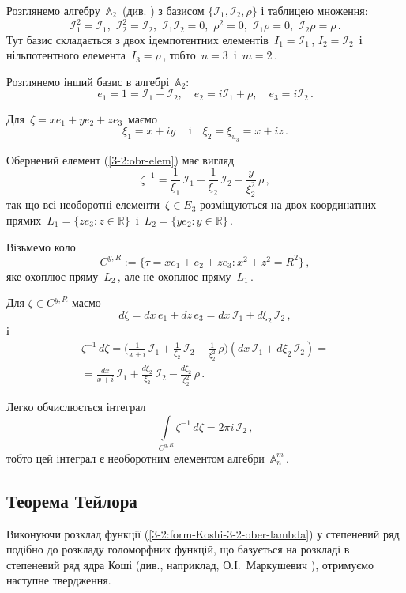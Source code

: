 \documentclass[11pt, reqno]{amsart}
\begin{document}
\begin{example}\label{3-2:ex-ne2pi}
Розглянемо алгебру\, ${\mathbb A_2}$\, (див. \cite{PlPu13}) з базисом $\{\mathcal{I}_1,
\mathcal{I}_2, \rho\}$ і таблицею множення:
\[\mathcal{I}_1^2=\mathcal{I}_1,\,\,
\mathcal{I}_2^2=\mathcal{I}_2,\,\,
\mathcal{I}_1\mathcal{I}_2=0,\,\, \rho^2=0,\,\,
\mathcal{I}_1\rho=0,\,\, \mathcal{I}_2\rho=\rho\,.\]
Тут базис складається з двох ідемпотентних елементів\, $I_1=\mathcal{I}_1$\,, $I_2=\mathcal{I}_2$\, і нільпотентного
елемента\, $I_3=\rho$\,, тобто\, $n=3$\, і\, $m=2$\,.

Розглянемо інший базис в алгебрі\, ${\mathbb A_2}$:
$$e_1=1=\mathcal{I}_1+\mathcal{I}_2, \quad e_2=i\mathcal{I}_1+\rho,\quad e_3=i\mathcal{I}_2\,.$$

Для\, $\zeta=xe_1+ye_2+ze_3$\, маємо
$$\xi_1=x+iy\, \quad \mbox{і} \quad   \xi_2=\xi_{u_3}=x+iz\,.$$

Обернений елемент (\ref{3-2:obr-elem}) має вигляд
$$\zeta^{-1}=\frac{1}{\xi_1}\,\mathcal{I}_1+\frac{1}{\xi_2}\,\mathcal{I}_2-\frac{y}{\xi_2^2}\,\rho\,,$$
так що всі необоротні елементи\, $\zeta\in E_3$ розміщуються на двох координатних прямих\,
$L_1=\{ze_3 : z\in\mathbb{R}\}$\, і\, $L_2=\{ye_2 : y\in\mathbb{R}\}$\,.


Візьмемо коло
\[C^{y,R}:=\{\tau=xe_1+e_2+ze_3 : x^2+z^2=R^2\}\,,\]
яке охоплює пряму\, $L_2$\,, але не охоплює пряму\, $L_1$\,.

Для $\zeta\in C^{y,R}$ маємо
$$d\zeta=dx\,e_1+dz\,e_3=dx\,\mathcal{I}_1+d\xi_2\,\mathcal{I}_2\,,$$
і
\begin{multline*}
\zeta^{-1}\,d\zeta=\biggl(\frac{1}{x+i}\,\mathcal{I}_1+\frac{1}{\xi_2}\,\mathcal{I}_2-\frac{1}{\xi_2^2}\,\rho\biggr) 
(dx\,\mathcal{I}_1+d\xi_2\,\mathcal{I}_2)=\\
=\frac{dx}{x+i}\,\mathcal{I}_1+\frac{d\xi_2}{\xi_2}\,\mathcal{I}_2-\frac{d\xi_2}{\xi_2^2}\,\rho\,.
\end{multline*}

Легко обчислюється інтеграл
$$\int\limits_{C^{y,R}}\zeta^{-1}\,d\zeta= 2\pi i\,\mathcal{I}_2\,,$$
тобто цей інтеграл є необоротним елементом алгебри\, $\mathbb{A}_n^m$\,.
\end{example}



\subsection{Теорема Тейлора}

Виконуючи розклад функції (\ref{3-2:form-Koshi-3-2-ober-lambda}) у степеневий ряд подібно
до розкладу голоморфних функцій, що базується на розкладі в степеневий ряд ядра Коші
(див., наприклад, О.І.~Маркушевич \cite[с.~298]{Markush-v1}), отримуємо наступне твердження.
\end{document}
